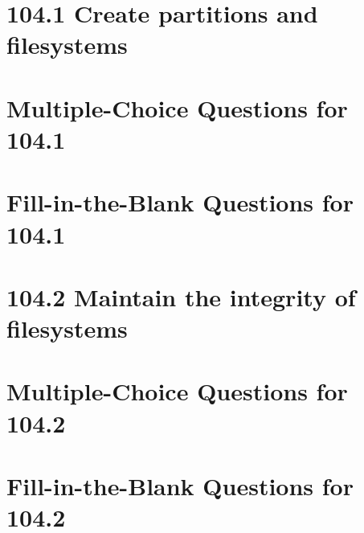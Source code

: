 \documentclass[a4paper]{report}
\begin{document}
\newpage
\section*{104.1 Create partitions and filesystems}

\newpage
\section*{Multiple-Choice Questions for 104.1}

\newpage
\section*{Fill-in-the-Blank Questions for 104.1}

\newpage
\section*{104.2 Maintain the integrity of filesystems}

\newpage
\section*{Multiple-Choice Questions for 104.2}

\newpage
\section*{Fill-in-the-Blank Questions for 104.2}
\end{document}
